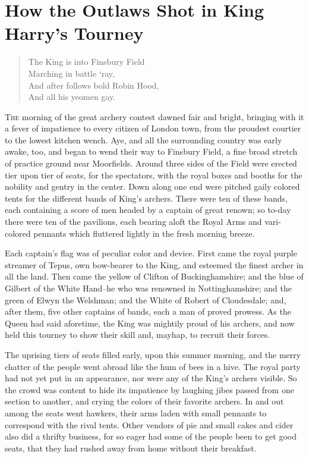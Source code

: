 \chapter{How the Outlaws Shot in King Harry’s Tourney}

\begin{quote}
The King is into Finsbury Field\\
Marching in battle ‘ray,\\
And after follows bold Robin Hood,\\
And all his yeomen gay.
\end{quote}

\lettrine{T}{he} morning of the great archery contest dawned fair and bright,
bringing with it a fever of impatience to every citizen of London town,
from the proudest courtier to the lowest kitchen wench. Aye, and all the
surrounding country was early awake, too, and began to wend their way to
Finsbury Field, a fine broad stretch of practice ground near Moorfields.
Around three sides of the Field were erected tier upon tier of seats,
for the spectators, with the royal boxes and booths for the nobility and
gentry in the center. Down along one end were pitched gaily colored
tents for the different bands of King's archers. There were ten of these
bands, each containing a score of men headed by a captain of great
renown; so to-day there were ten of the pavilions, each bearing aloft
the Royal Arms and vari-colored pennants which fluttered lightly in the
fresh morning breeze.

Each captain's flag was of peculiar color and device. First came the
royal purple streamer of Tepus, own bow-bearer to the King, and esteemed
the finest archer in all the land. Then came the yellow of Clifton of
Buckinghamshire; and the blue of Gilbert of the White Hand--he who was
renowned in Nottinghamshire; and the green of Elwyn the Welshman; and
the White of Robert of Cloudesdale; and, after them, five other captains
of bands, each a man of proved prowess. As the Queen had said aforetime,
the King was mightily proud of his archers, and now held this tourney to
show their skill and, mayhap, to recruit their forces.

The uprising tiers of seats filled early, upon this summer morning, and
the merry chatter of the people went abroad like the hum of bees in a
hive. The royal party had not yet put in an appearance, nor were any of
the King's archers visible. So the crowd was content to hide its
impatience by laughing jibes passed from one section to another, and
crying the colors of their favorite archers. In and out among the seats
went hawkers, their arms laden with small pennants to correspond with
the rival tents. Other vendors of pie and small cakes and cider also did
a thrifty business, for so eager had some of the people been to get good
seats, that they had rushed away from home without their breakfast.

